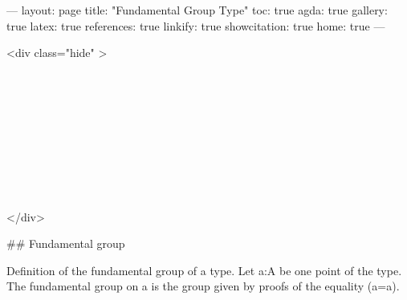 ---
layout: page
title: "Fundamental Group Type"
toc: true
agda: true
gallery: true
latex: true
references: true
linkify: true
showcitation: true
home: true
---


<div class="hide" >
\begin{code}%
\>[0]\AgdaSymbol{\{-\#}\AgdaSpace{}%
\AgdaSpace{}%
\AgdaSpace{}%
\AgdaSymbol{\#-\}}\<%
\\
\>[0]\AgdaSpace{}%
\AgdaSpace{}%
\<%
\\
\>[0]\AgdaSpace{}%
\AgdaSpace{}%
\<%
\\
%
\\[\AgdaEmptyExtraSkip]%
\>[0]\AgdaSpace{}%
\AgdaSpace{}%
\<%
\\
\>[0]\AgdaSpace{}%
\AgdaSpace{}%
\<%
\\
\>[0]\AgdaSpace{}%
\AgdaSpace{}%
\<%
\\
\>[0]\AgdaSpace{}%
\AgdaSpace{}%
\<%
\\
\>[0]\AgdaSpace{}%
\AgdaSpace{}%
\<%
\end{code}
</div>

## Fundamental group

Definition of the fundamental group of a type.
Let a:A be one point of the type. The fundamental group on a is the
group given by proofs of the equality (a=a).

